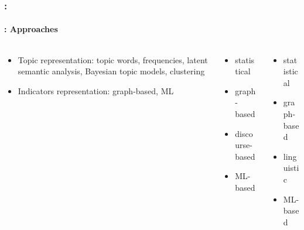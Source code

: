 \documentclass[xcolor=table]{beamer}
\begin{document}
\begin{frame}
	\frametitle{\insertshortsubtitle: \insertsection}
	\framesubtitle{\insertsubsection: Approaches}
	
	\begin{columns}
		\begin{column}{0.4\textwidth}
			\begin{block}{\scriptsize\bfseries\cite{12-nenkova-mckeown}}
				\begin{itemize}
					\item Topic representation:
					topic words,
					frequencies,
					latent semantic analysis,
					Bayesian topic models,
					clustering

					\item Indicators representation: 
					graph-based, 
					ML
				\end{itemize}
			\end{block}
		\end{column}
		\begin{column}{0.3\textwidth}
			\begin{block}{\scriptsize\bfseries\cite{12-lloret-palomar}}
				\begin{itemize}
					\item statistical 
					\item graph-based
					\item discourse-based
					\item ML-based
				\end{itemize}
			\end{block}
		\end{column}
		\begin{column}{0.28\textwidth}
			\begin{block}{\scriptsize\bfseries\cite{19-aries-al}}
				\begin{itemize}
					\item statistical
					\item graph-based
					\item linguistic 
					\item ML-based
				\end{itemize}
			\end{block}
		\end{column}
	\end{columns}

\end{frame}
\end{document}
